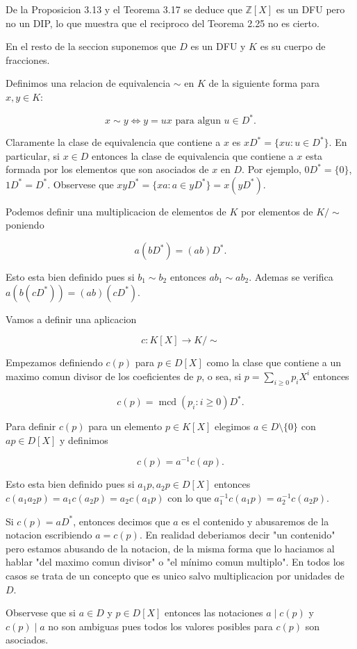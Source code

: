 De la Proposicion 3.13 y el Teorema 3.17 se deduce que ${\mathbb{Z}}[X]$ es un DFU pero no un DIP, lo que muestra que el reciproco del Teorema 2.25 no es cierto.

En el resto de la seccion suponemos que $D$ es un DFU y $K$ es su cuerpo de fracciones.

Definimos una relacion de equivalencia $\sim$ en $K$ de la siguiente forma para $x,y\in K$:

\[x\sim y\Leftrightarrow y=ux\text{ para algun }u\in D^{*}.\]

Claramente la clase de equivalencia que contiene a $x$ es $xD^{*}=\{xu:u\in D^{*}\}$. En particular, si $x\in D$ entonces la clase de equivalencia que contiene a $x$ esta formada por los elementos que son asociados de $x$ en $D$. Por ejemplo, $0D^{*}=\{0\}$, $1D^{*}=D^{*}$. Observese que $xyD^{*}=\{xa:a\in yD^{*}\}=x(yD^{*})$.

Podemos definir una multiplicacion de elementos de $K$ por elementos de $K/\sim$ poniendo

\[a(bD^{*})=(ab)D^{*}.\]

Esto esta bien definido pues si $b_{1}\sim b_{2}$ entonces $ab_{1}\sim ab_{2}$. Ademas se verifica $a(b(cD^{*}))=(ab)(cD^{*})$.

Vamos a definir una aplicacion

\[c:K[X]\to K/\sim\]

Empezamos definiendo $c(p)$ para $p\in D[X]$ como la clase que contiene a un maximo comun divisor de los coeficientes de $p$, o sea, si $p=\sum_{i\geq 0}p_{i}X^{i}$ entonces

\[c(p)=\operatorname{mcd}(p_{i}:i\geq 0)D^{*}.\]

Para definir $c(p)$ para un elemento $p\in K[X]$ elegimos $a\in D\setminus\{0\}$ con $ap\in D[X]$ y definimos

\[c(p)=a^{-1}c(ap).\]

Esto esta bien definido pues si $a_{1}p,a_{2}p\in D[X]$ entonces $c(a_{1}a_{2}p)=a_{1}c(a_{2}p)=a_{2}c(a_{1}p)$ con lo que $a_{1}^{-1}c(a_{1}p)=a_{2}^{-1}c(a_{2}p)$.

Si $c(p)=aD^{*}$, entonces decimos que $a$ es el contenido y abusaremos de la notacion escribiendo $a=c(p)$. En realidad deberiamos decir "un contenido" pero estamos abusando de la notacion, de la misma forma que lo haciamos al hablar "del maximo comun divisor" o "el mínimo comun multiplo". En todos los casos se trata de un concepto que es unico salvo multiplicacion por unidades de $D$.

Observese que si $a\in D$ y $p\in D[X]$ entonces las notaciones $a\mid c(p)$ y $c(p)\mid a$ no son ambiguas pues todos los valores posibles para $c(p)$ son asociados.

